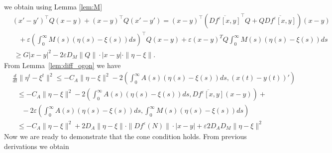 \documentclass[11pt, leqno]{amsart}
\theoremstyle{definition}
\begin{document}
we obtain using Lemma \ref{lem:M}
\begin{align*}
	&(x'-y')^\top Q (x-y) +  (x-y)^\top Q (x'-y') = (x-y)^\top\left( \overline{Df^\varepsilon[x,y]}^\top Q + Q \overline{Df^\varepsilon[x,y]} \right)(x-y) \\
&\ \ \ \ 	+ \varepsilon \left( \int_0^\infty M(s) (\eta(s) - \xi(s))ds \right)^\top Q (x-y) + \varepsilon (x-y)^T Q \int_0^\infty M(s) (\eta(s) - \xi(s))ds    \\
&\ 	\geq G |x-y|^2 -2 \varepsilon D_M \|Q\| \cdot |x-y| \cdot \|\eta - \xi\|.
\end{align*}
From Lemma~\ref{lem:diff_ogon} we have
\begin{align*}
	&\frac{d}{dt} \|\eta^t - \xi^t\|^2 \leq - C_A \|\eta - \xi\|^2 - 2\left(\int_0^\infty A(s) (\eta(s) - \xi(s))ds, (x(t)-y(t))' \right) \\
&\ \ \ 	\leq - C_A \|\eta - \xi\|^2  - 2 \left(\int_0^\infty A(s) (\eta(s) - \xi(s))ds, \overline{Df^\varepsilon[x,y]}(x-y) \right) + \\
&\ \ \ \ \ \ 	-2\varepsilon \left(\int_0^\infty A(s) (\eta(s) - \xi(s))ds, \int_0^\infty M(s) (\eta(s) - \xi(s))ds \right) \\
&\ \  \ 	\leq - C_A \|\eta - \xi\|^2  + 2 D_A \|\eta - \xi\| \cdot \|Df^\varepsilon (N)\| \cdot |x-y | + \varepsilon 2 D_A D_M \|\eta - \xi\|^2
\end{align*}
Now we are ready to demonstrate that the cone condition holds. From previous derivations we obtain
\end{document}
